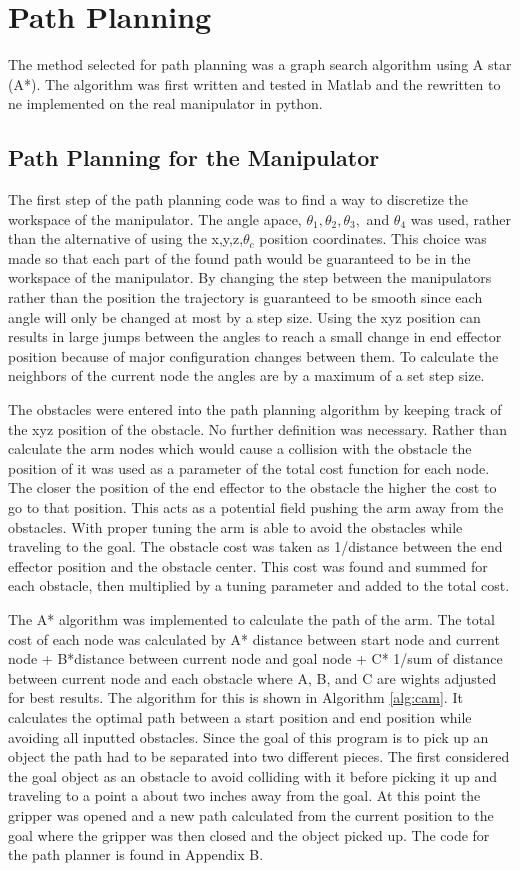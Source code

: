 \chapter{Path Planning}
The method selected for path planning was a graph search algorithm using A star (A*). The algorithm was first written and tested in Matlab and the rewritten to ne implemented on the real manipulator in python. 


\section{Path Planning for the Manipulator}
The first step of the path planning code was to find a way to discretize the workspace of the manipulator. The angle apace, $\theta_1, \theta_2, \theta_3,$ and $\theta_4$ was used, rather than the alternative of using the x,y,z,$\theta_c$ position coordinates. This choice was made so that each part of the found path would be guaranteed to be in the workspace of the manipulator. By changing the step between the manipulators rather than the position the trajectory is guaranteed to  be smooth since each angle will only be changed at most by a step size. Using the xyz position can results in large jumps between the angles to reach a small change in end effector position because of major configuration changes between them. To calculate the neighbors of the current node the angles are by a maximum of a set step size. 

The obstacles were entered into the path planning algorithm by keeping track of the xyz position of the obstacle. No further definition was necessary. Rather than calculate the arm nodes which would cause a collision with the obstacle the position of it was used as a parameter of the total cost function for each node. The closer the position of the end effector to the obstacle the higher the cost to go to that position. This acts as a potential field pushing the arm away from the obstacles. With proper tuning the arm is able to avoid the obstacles while traveling to the goal. The obstacle cost was taken as 1/distance between the end effector position and the obstacle center. This cost was found and summed for each obstacle, then multiplied by a tuning parameter and added to the total cost.

The A* algorithm was implemented to calculate the path of the arm. The total cost of each node was calculated by A* distance between start node and current node + B*distance between current node and goal node + C* 1/sum of distance between current node and each obstacle where A, B, and C are wights adjusted for best results. The algorithm for this is shown in Algorithm \ref{alg:cam}. It calculates the optimal path between a start position and end position while avoiding all inputted obstacles. Since the goal of this program is to pick up an object the path had to be separated into two different pieces.  The first considered the goal object as an obstacle to avoid colliding with it before picking it up and traveling to a point a about two inches away from the goal. At this point the gripper was opened and a new path calculated from the current position to the goal where the gripper was then closed and the object picked up. The code for the path planner is found in Appendix B.

